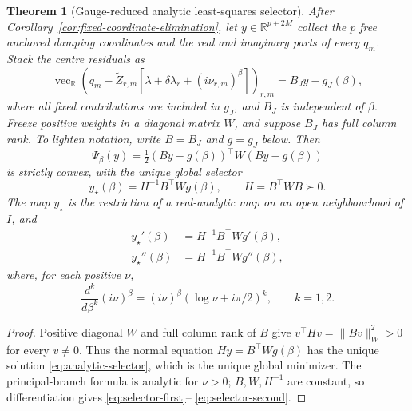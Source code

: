 \documentclass[11pt]{article}
\newtheorem{theorem}{Theorem}
\theoremstyle{definition}
\theoremstyle{remark}
\newcommand{\R}{\mathbb R}
\begin{document}
\begin{theorem}[Gauge-reduced analytic least-squares selector]
\label{thm:analytic-selector}
After Corollary~\ref{cor:fixed-coordinate-elimination}, let
\(y\in\R^{p+2M}\) collect the \(p\) free anchored damping coordinates and the
real and imaginary parts of every \(q_m\).  Stack the centre residuals as
\begin{equation}
 \operatorname{vec}_{\R}
 \left(q_m-\widetilde Z_{r,m}
 [\bar\lambda+\delta\lambda_r+(i\nu_{r,m})^\beta]\right)_{r,m}
 =B_Jy-g_J(\beta),
 \label{eq:selector-residual}
\end{equation}
where all fixed contributions are included in \(g_J\), and \(B_J\) is
independent of \(\beta\).  Freeze positive weights in a diagonal matrix \(W\),
and suppose \(B_J\) has full column rank.  To lighten notation, write
\(B=B_J\) and \(g=g_J\) below.  Then
\[
 \Psi_\beta(y)=\tfrac12(By-g(\beta))^\top W(By-g(\beta))
\]
is strictly convex, with the unique global selector
\begin{equation}
 y_\star(\beta)=H^{-1}B^\top Wg(\beta),
 \qquad H=B^\top WB\succ0.
 \label{eq:analytic-selector}
\end{equation}
The map \(y_\star\) is the restriction of a real-analytic map on an open
neighbourhood of \(I\), and
\begin{align}
 y_\star'(\beta)&=H^{-1}B^\top Wg'(\beta),\label{eq:selector-first}\\
 y_\star''(\beta)&=H^{-1}B^\top Wg''(\beta),\label{eq:selector-second}
\end{align}
where, for each positive \(\nu\),
\[
 \frac{d^k}{d\beta^k}(i\nu)^\beta
 =(i\nu)^\beta(\log\nu+i\pi/2)^k,
 \qquad k=1,2.
\]
\end{theorem}
\begin{proof}
Positive diagonal \(W\) and full column rank of \(B\) give
\(v^\top Hv=\|Bv\|_W^2>0\) for every \(v\ne0\).  Thus the normal equation
\(Hy=B^\top Wg(\beta)\) has the unique solution
\eqref{eq:analytic-selector}, which is the unique global minimizer.  The
principal-branch formula is analytic for \(\nu>0\); \(B,W,H^{-1}\) are
constant, so differentiation gives \eqref{eq:selector-first}--
\eqref{eq:selector-second}.
\end{proof}
\end{document}
